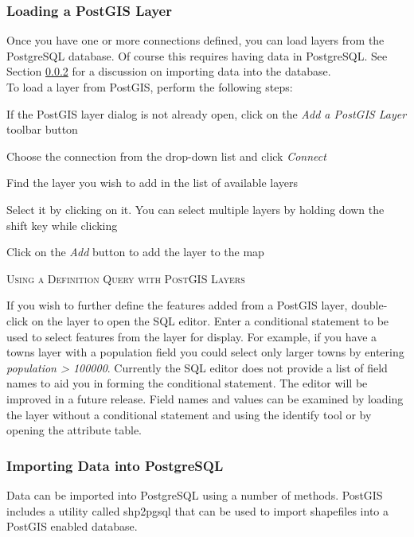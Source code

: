 \documentclass[10pt,english]{article}
\newcommand\qgistip[1]{\raggedright\small{#1}}
\begin{document}
\begin{onehalfspace}
\subsubsection{Loading a PostGIS Layer}
Once you have one or more connections defined, you can load layers from the PostgreSQL database. Of course this requires having data in PostgreSQL. See Section \ref{sec:loading_postgis_data} for a discussion on importing data into the database. \\

To load a layer from PostGIS, perform the following steps:
\begin{compactenum}
\item If the PostGIS layer dialog is not already open, click on the \textit{Add a PostGIS Layer} toolbar button
\item Choose the connection from the drop-down list and click \textsl{Connect}
\item Find the layer you wish to add in the list of available layers
\item Select it by clicking on it. You can select multiple layers by holding down the shift key while clicking
\item Click on the \textsl{Add} button to add the layer to the map
\end{compactenum}
\begin{Tip}\caption{\textsc{Using a Definition Query with PostGIS Layers}}
\qgistip{If you wish to further define the features added from a PostGIS layer, double-click on the layer to open the SQL editor. Enter a conditional statement to be used to select features from the layer for display. For example, if you have a towns layer with a population field you could select only larger towns by entering \textsl{population > 100000}. Currently the SQL editor does not provide a list of field names to aid you in forming the conditional statement. The editor will be improved in a future release. Field names and values can be examined by loading the layer without a conditional statement and using the identify tool or by opening the attribute table.
}
\end{Tip}
\subsubsection{Importing Data into PostgreSQL}\label{sec:loading_postgis_data} 
Data can be imported into PostgreSQL using a number of methods. PostGIS includes a utility called shp2pgsql that can be used to import shapefiles into a PostGIS enabled database. \\


\end{onehalfspace}
\end{document}
